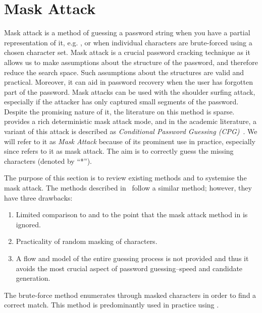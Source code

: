 \section{Mask Attack}
\label{sec::chp5::mask-attack}

Mask attack is a method of guessing a password string when you have a partial representation of it, e.g. , or when individual characters are brute-forced using a chosen character set. Mask attack is a crucial password cracking technique as it allows us to make assumptions about the structure of the password, and therefore reduce the search space. Such assumptions about the structures are valid and practical. Moreover, it can aid in password recovery when the user has forgotten part of the password. Mask attacks can be used with the shoulder surfing attack, especially if the attacker has only captured small segments of the password. Despite the promising nature of it, the literature on this method is sparse. \hashcat provides a rich deterministic mask attack mode, and in the academic literature, a variant of this attack is described as \textit{Conditional Password Guessing (CPG)}~\cite{pasquini_improving_2021, xu_improving_2023}. We will refer to it as \textit{Mask Attack} because of its prominent use in practice, especially since \hashcat refers to it as mask attack. The aim is to correctly guess the missing characters (denoted by ``*'').

The purpose of this section is to review existing methods and to systemise the mask attack. The methods described in~\cite{pasquini_improving_2021, xu_improving_2023} follow a similar method; however, they have three drawbacks:
\begin{enumerate}
    \item Limited comparison to \hashcat and to the point that the mask attack method in \hashcat is ignored.
    
    \item Practicality of random masking of characters.
    
    \item A flow and model of the entire guessing process is not provided and thus it avoids the most crucial aspect of password guessing--speed and candidate generation.
\end{enumerate}

The brute-force method enumerates through masked characters in order to find a correct match. This method is predominantly used in practice using \hashcat.

% 

